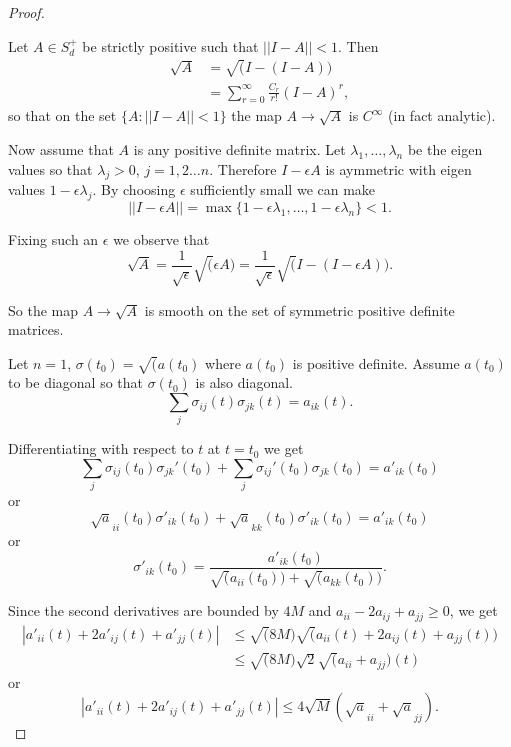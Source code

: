 \begin{proof}
\setcounter{step}{0}
\begin{step}%
Let $A\in S^{+}_{d}$ be strictly positive such that $||I-A||<1$. Then
\begin{align*}
\surd A &= \surd (I-(I-A))\\
&= \sum\limits^{\infty}_{r=0}\frac{C_{r}}{r!}(I-A)^{r}, 
\end{align*}
so that on the set $\{A:||I-A||<1\}$ the map $A\to \surd A$ is
$C^{\infty}$ (in fact analytic).
\end{step}

Now assume that $A$ is any positive definite matrix. Let
$\lambda_{1},\ldots,\lambda_{n}$ be the eigen values so that
$\lambda_{j}>0$, $j=1,2\ldots n$. Therefore $I-\epsilon A$ is
aymmetric with eigen values $1-\epsilon \lambda_{j}$. By choosing
$\epsilon$ sufficiently small we can make
$$
||I-\epsilon A||=\max \{1-\epsilon
\lambda_{1},\ldots,1-\epsilon\lambda_{n}\}<1. 
$$

Fixing such an $\epsilon$ we observe that
$$
\surd A=\dfrac{1}{\surd \epsilon}\surd (\epsilon A)=\frac{1}{\surd
  \epsilon}\surd (I-(I-\epsilon A)).
$$\pageoriginale

So the map $A\to\surd A$ is smooth on the set of symmetric positive
definite matrices.

\begin{step}%
Let $n=1$, $\sigma(t_{0})=\surd (a(t_{0})$ where $a(t_{0})$ is
positive definite. Assume $a(t_{0})$ to be diagonal so that
$\sigma(t_{0})$ is also diagonal.
$$
\sum_{j}\sigma_{ij}(t)\sigma_{jk}(t)=a_{ik}(t).
$$

Differentiating with respect to $t$ at $t=t_{0}$ we get
$$
\sum_{j}\sigma_{ij}(t_{0})\sigma_{jk}'(t_{0})+\sum_{j}\sigma_{ij}'(t_{0})\sigma_{jk}(t_{0})=a'_{ik}(t_{0}) 
$$
or
$$
\surd a_{ii}(t_{0})\sigma'_{ik}(t_{0})+\surd
a_{kk}(t_{0})\sigma'_{ik}(t_{0})=a'_{ik}(t_{0}) 
$$
or
$$
\sigma'_{ik}(t_{0})=\frac{a'_{ik}(t_{0})}{\surd (a_{ii}(t_{0}))+\surd
  (a_{kk}(t_{0}))}.
$$
\end{step}

Since the second derivatives are bounded by $4M$ and
$a_{ii}-2a_{ij}+a_{jj}\geq 0$, we get
\begin{align*}
|a'_{ii}(t)+2a'_{ij}(t)+a'_{jj}(t)| &\leq \surd (8M)\surd
(a_{ii}(t)+2a_{ij}(t)+a_{jj}(t))\\ 
&\leq \surd (8M)\surd 2\surd (a_{ii}+a_{jj})(t)
\end{align*}
or
\begin{equation*}
|a'_{ii}(t)+2a'_{ij}(t)+a'_{jj}(t)|\leq 4\surd M(\surd a_{ii}+\surd
a_{jj}).\tag{1}\label{chap27-eq1} 
\end{equation*}


\end{proof}
